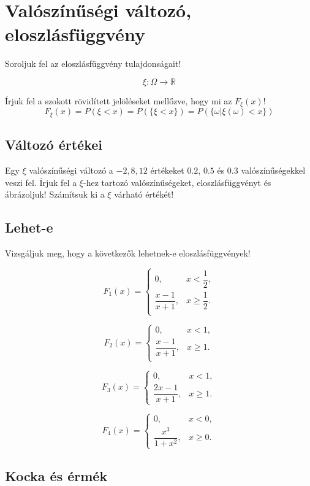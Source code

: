 \documentclass[a4paper]{article}
\begin{document}
\section{Valószínűségi változó, eloszlásfüggvény}

Soroljuk fel az eloszlásfüggvény tulajdonságait!

\[
\xi: \Omega \rightarrow \mathbb{R}
\]

Írjuk fel a szokott rövidített jelöléseket mellőzve, hogy mi az $F_{\xi}(x)$!
\[
F_{\xi}(x) =
P(\xi < x) =
P(\{\xi < x \}) =
P(\{\omega | \xi(\omega) < x\})
\]

\subsection{Változó értékei}

Egy $\xi$ valószínűségi változó a $-2, 8, 12$ értékeket $0.2$, $0.5$ és $0.3$ valószínűségekkel veszi fel.
Írjuk fel a $\xi$-hez tartozó valószínűségeket, eloszlásfüggvényt és ábrázoljuk!
Számítsuk ki a $\xi$ várható értékét!

\subsection{Lehet-e}

Vizsgáljuk meg, hogy a következők lehetnek-e eloszlásfüggvények!

\[
F_1(x) = \begin{cases}
0, & x < \dfrac{1}{2}, \\
\dfrac{x - 1}{x + 1}, & x \geq \dfrac{1}{2}. \\
\end{cases}
\]

\[
F_2(x) = \begin{cases}
0, & x < 1, \\
\dfrac{x - 1}{x + 1}, & x \geq 1. \\
\end{cases}
\]

\[
F_3(x) = \begin{cases}
0, & x < 1, \\
\dfrac{2x - 1}{x + 1}, & x \geq 1.
\end{cases}
\]

\[
F_4(x) = \begin{cases}
0, & x < 0, \\
\dfrac{x^3}{1 + x^2}, & x \geq 0.
\end{cases}
\]

\subsection{Kocka és érmék}
\end{document}
